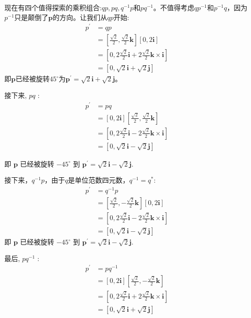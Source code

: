 现在有四个值得探索的乘积组合:$q p, pq, q^{-1} p$和$p q^{-1}$。不值得考虑$q p^{-1}$和$p^{-1} q$，因为$p^{-1}$只是颠倒了$\mathbf{p}$的方向。让我们从$q p$开始:
$$
\begin{aligned}
p^{\prime} & =q p \\
& =\left[\frac{\sqrt{2}}{2}, \frac{\sqrt{2}}{2} \mathbf{k}\right][0,2 \mathbf{i}] \\
& =\left[0,2 \frac{\sqrt{2}}{2} \mathbf{i}+2 \frac{\sqrt{2}}{2} \mathbf{k} \times \mathbf{i}\right] \\
& =[0, \sqrt{2} \mathbf{i}+\sqrt{2} \mathbf{j}]
\end{aligned}
$$
即$\mathbf{p}$已经被旋转$45^{\circ}$为$\mathbf{p}^{\prime}=\sqrt{2} \mathbf{i}+\sqrt{2} \mathbf{j}$。

接下来, $p q$ :
$$
\begin{aligned}
p^{\prime} & =p q \\
& =[0,2 \mathbf{i}]\left[\frac{\sqrt{2}}{2}, \frac{\sqrt{2}}{2} \mathbf{k}\right] \\
& =\left[0,2 \frac{\sqrt{2}}{2} \mathbf{i}-2 \frac{\sqrt{2}}{2} \mathbf{k} \times \mathbf{i}\right] \\
& =[0, \sqrt{2} \mathbf{i}-\sqrt{2} \mathbf{j}]
\end{aligned}
$$

即 $\mathbf{p}$ 已经被旋转 $-45^{\circ}$ 到 $\mathbf{p}^{\prime}=\sqrt{2} \mathbf{i}-\sqrt{2} \mathbf{j}$.

接下来，$q^{-1} p$，由于$q$是单位范数四元数，$q^{-1}=q^{*}$:
$$
\begin{aligned}
p^{\prime} & =q^{-1} p \\
& =\left[\frac{\sqrt{2}}{2},-\frac{\sqrt{2}}{2} \mathbf{k}\right][0,2 \mathbf{i}] \\
& =\left[0,2 \frac{\sqrt{2}}{2} \mathbf{i}-2 \frac{\sqrt{2}}{2} \mathbf{k} \times \mathbf{i}\right] \\
& =[0, \sqrt{2} \mathbf{i}-\sqrt{2} \mathbf{j}]
\end{aligned}
$$
即 $\mathbf{p}$ 已经被旋转 $-45^{\circ}$ 到 $\mathbf{p}^{\prime}=\sqrt{2} \mathbf{i}-\sqrt{2} \mathbf{j}$.

最后, $p q^{-1}$ :
$$
\begin{aligned}
p^{\prime} & =p q^{-1} \\
& =[0,2 \mathbf{i}]\left[\frac{\sqrt{2}}{2},-\frac{\sqrt{2}}{2} \mathbf{k}\right] \\
& =\left[0,2 \frac{\sqrt{2}}{2} \mathbf{i}+2 \frac{\sqrt{2}}{2} \mathbf{k} \times \mathbf{i}\right] \\
& =[0, \sqrt{2} \mathbf{i}+\sqrt{2} \mathbf{j}]
\end{aligned}
$$

